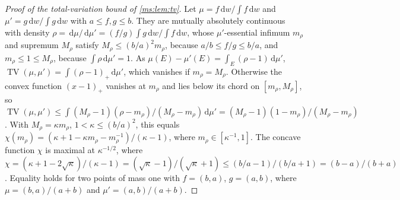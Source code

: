\documentclass[11pt,a4paper]{amsart}
\theoremstyle{definition}
\theoremstyle{remark}
\numberwithin{equation}{section}
\DeclareMathOperator{\TV}{TV}        %
\newcommand{\dd}{\,\mathrm{d}}             %
\begin{document}
\begin{proof}[Proof of the total-variation bound of \cref{ms:lem:tv}]
Let $\mu=f\dd w/\int f\dd w$ and $\mu'=g\dd w/\int g\dd w$ with $a\le f,g\le b$. They are mutually absolutely continuous with density $\rho=\dd\mu/\dd\mu'=(f/g)\int g\dd w/\int f\dd w$, whose $\mu'$-essential infimum $m_\rho$ and supremum $M_\rho$ satisfy $M_\rho\le(b/a)^2m_\rho$, because $a/b\le f/g\le b/a$, and $m_\rho\le1\le M_\rho$, because $\int\rho\dd\mu'=1$. As $\mu(E)-\mu'(E)=\int_E(\rho-1)\dd\mu'$, $\TV(\mu,\mu')=\int(\rho-1)_+\dd\mu'$, which vanishes if $m_\rho=M_\rho$. Otherwise the convex function $(x-1)_+$ vanishes at $m_\rho$ and lies below its chord on $[m_\rho,M_\rho]$, so $\TV(\mu,\mu')\le\int(M_\rho-1)(\rho-m_\rho)/(M_\rho-m_\rho)\dd\mu'=(M_\rho-1)(1-m_\rho)/(M_\rho-m_\rho)$. With $M_\rho=\kappa m_\rho$, $1<\kappa\le(b/a)^2$, this equals $\chi(m_\rho)=(\kappa+1-\kappa m_\rho-m_\rho^{-1})/(\kappa-1)$, where $m_\rho\in[\kappa^{-1},1]$. The concave function $\chi$ is maximal at $\kappa^{-1/2}$, where $\chi=(\kappa+1-2\sqrt\kappa)/(\kappa-1)=(\sqrt\kappa-1)/(\sqrt\kappa+1)\le(b/a-1)/(b/a+1)=(b-a)/(b+a)$. Equality holds for two points of mass one with $f=(b,a)$, $g=(a,b)$, where $\mu=(b,a)/(a+b)$ and $\mu'=(a,b)/(a+b)$.
\end{proof}
\end{document}
